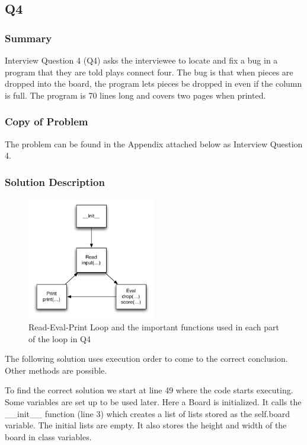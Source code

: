 \subsection{Q4}
\subsubsection{Summary}
Interview Question 4 (Q4) asks the interviewee to locate and fix a bug in a program that they are told plays connect four.
The bug is that when pieces are dropped into the board, the program lets pieces be dropped in even if the column is full.
The program is 70 lines long and covers two pages when printed.
\subsubsection{Copy of Problem}
The problem can be found in the Appendix attached below as Interview Question 4.

\subsubsection{Solution Description}
\begin{figure}[t]
\centering
\includegraphics[width=0.5\textwidth]{Q4diagram.pdf}
\caption{Read-Eval-Print Loop and the important functions used in each part of the loop in Q4}
\label{fig-q2}
\end{figure}

The following solution uses execution order to come to the correct conclusion. Other methods are possible. 

To find the correct solution we start at line 49 where the code starts executing.
Some variables are set up to be used later. 
Here a Board is initialized.
It calls the \_\_init\_\_ function (line 3) which creates a list of lists stored as the self.board variable.
The initial lists are empty.
It also stores the height and width of the board in class variables. \\

